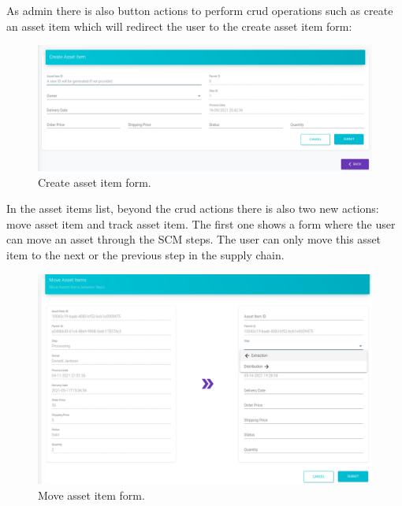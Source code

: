 As admin there is also button actions to perform crud operations such as create an asset item which will redirect the user to the create asset item form: 

\begin{figure}[H]
\begin{center}
  \includegraphics[scale=0.34]{images/use_example/09_create_asset_Item.png}
\caption{Create asset item form.}
\label{fig:create_asset_item}
\end{center}
\end{figure}


In the asset items list, beyond the crud actions there is also two new actions: move asset item and track asset item. The first one shows a form where the user can move an asset through the SCM steps. The user can only move this asset item to the next or the previous step in the supply chain.

\begin{figure}[H]
\begin{center}
  \includegraphics[scale=0.34]{images/use_example/091_move_asset_Item.png}
\caption{Move asset item form.}
\label{fig:move_asset_item}
\end{center}
\end{figure}

